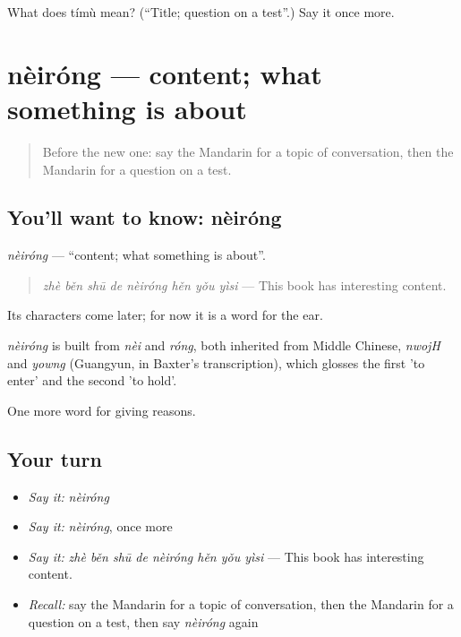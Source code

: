 \begin{tcolorbox}[breakable,colback=teal!4,colframe=teal!35!black,title={Before you move on}]
What does tímù mean? (\textquotedblleft{}Title; question on a test\textquotedblright{}.) Say it once more.
\end{tcolorbox}
\section[nèiróng]{nèiróng — content; what something is about}

\label{lesson:ZH-C354-neirong}



\begin{quote}
Before the new one: say the Mandarin for a topic of conversation, then the Mandarin for a question on a test.
\end{quote}

\subsection*{You'll want to know: nèiróng}
\emph{nèiróng} — \textquotedblleft{}content; what something is about\textquotedblright{}.

\begin{quote}
\emph{zhè běn shū de nèiróng hěn yǒu yìsi} — This book has interesting content.
\end{quote}

Its characters come later; for now it is a word for the ear.

\begin{cousinweb}
\emph{nèiróng} is built from \emph{nèi} and \emph{róng}, both inherited from Middle Chinese, \emph{nwojH} and \emph{yowng} (Guangyun, in Baxter's transcription), which glosses the first 'to enter' and the second 'to hold'.
\end{cousinweb}

\begin{grammarlens}[title={What you've built}]
One more word for giving reasons.
\end{grammarlens}

\subsection*{Your turn}
\begin{itemize}
\raggedright
  \item \emph{Say it:} \emph{nèiróng}
  \item \emph{Say it:} \emph{nèiróng}, once more
  \item \emph{Say it:} \emph{zhè běn shū de nèiróng hěn yǒu yìsi} — This book has interesting content.
  \item \emph{Recall:} say the Mandarin for a topic of conversation, then the Mandarin for a question on a test, then say \emph{nèiróng} again
\end{itemize}

